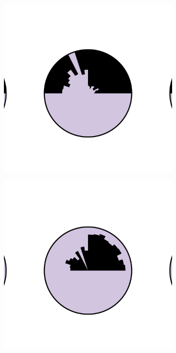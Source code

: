 \begin{figure}[ht]
\begin{subfigure}{0.23\linewidth}
\centering
\includegraphics[width=\linewidth,clip,trim={2.4cm 4cm 1.7cm 4cm}]{infuse/g0}
\caption{}
\label{subfig:inward}
\end{subfigure}%
\hspace*{0.01\linewidth}%
\begin{subfigure}{0.23\linewidth}
\centering
\includegraphics[width=\linewidth,clip,trim={2.4cm 4cm 1.7cm 4cm}]{infuse/g1}

\end{subfigure}
\end{figure}
